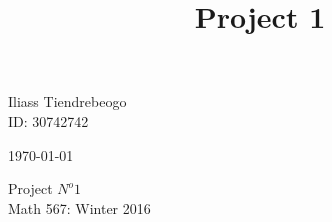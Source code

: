\documentclass{article}[14pt]
\begin{document}
\begin{center}


\title{Project 1}
\hfill Iliass Tiendrebeogo\\
\hfill ID: 30742742

\bigskip
\hfill \today\\
\end{center}
\bigskip

\begin{center}
  \begin{Large}
      
    Project $N^o 1$ \\
    Math 567: Winter 2016 \\
       
  \end{Large}
\end{center}

\bigskip
\end{document}
